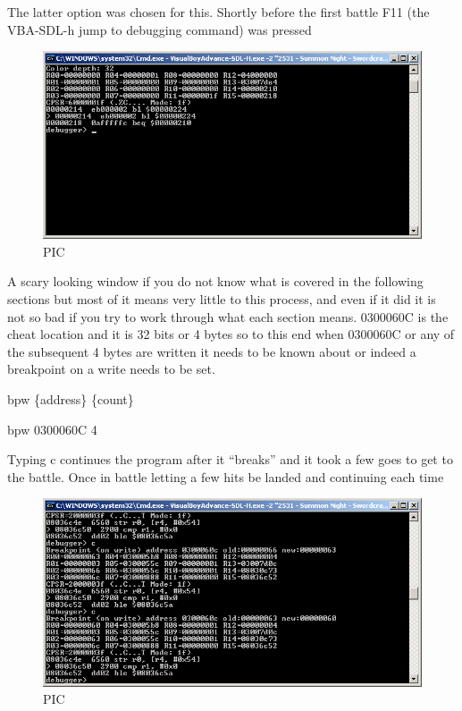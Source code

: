 \documentclass[
]{book}
\begin{document}
The latter option was chosen for this. Shortly before the first battle F11 (the VBA-SDL-h jump to debugging command) was pressed

\begin{figure}
\centering
\includegraphics{images/211_home_fast6191_romhackingguide_unrenamed_fil___orders_romhackingguidecheatasminstruction_1.png}
\caption{PIC}
\end{figure}

A scary looking window if you do not know what is covered in the following sections but most of it means very little to this process, and even if it did it is not so bad if you try to work through what each section means. 0300060C is the cheat location and it is 32 bits or 4 bytes so to this end when 0300060C or any of the subsequent 4 bytes are written it needs to be known about or indeed a breakpoint on a write needs to be set.

bpw \{address\} \{count\}

bpw 0300060C 4

Typing c continues the program after it ``breaks'' and it took a few goes to get to the battle. Once in battle letting a few hits be landed and continuing each time

\begin{figure}
\centering
\includegraphics{images/212_home_fast6191_romhackingguide_unrenamed_fil___orders_romhackingguidecheatasminstruction_2.png}
\caption{PIC}
\end{figure}
\end{document}
